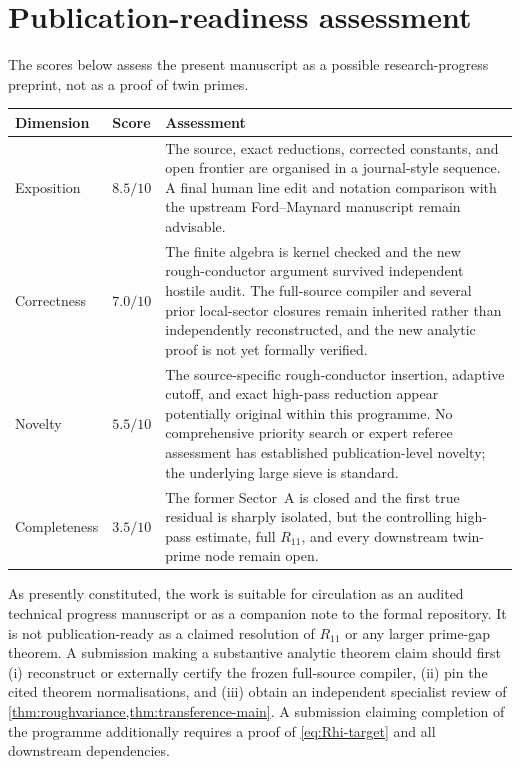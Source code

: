 \section{Publication-readiness assessment}\label{app:readiness}

The scores below assess the present manuscript as a possible research-progress
preprint, not as a proof of twin primes.

\begin{center}
\begin{tabularx}{\textwidth}{@{}p{}p{}X@{}}
\toprule
Dimension & Score & Assessment \\
\midrule
Exposition & $8.5/10$ & The source, exact reductions, corrected constants, and open frontier are organised in a journal-style sequence.  A final human line edit and notation comparison with the upstream Ford--Maynard manuscript remain advisable. \\
\addlinespace
Correctness & $7.0/10$ & The finite algebra is kernel checked and the new rough-conductor argument survived independent hostile audit.  The full-source compiler and several prior local-sector closures remain inherited rather than independently reconstructed, and the new analytic proof is not yet formally verified. \\
\addlinespace
Novelty & $5.5/10$ & The source-specific rough-conductor insertion, adaptive cutoff, and exact high-pass reduction appear potentially original within this programme.  No comprehensive priority search or expert referee assessment has established publication-level novelty; the underlying large sieve is standard. \\
\addlinespace
Completeness & $3.5/10$ & The former Sector~A is closed and the first true residual is sharply isolated, but the controlling high-pass estimate, full $R_{11}$, and every downstream twin-prime node remain open. \\
\bottomrule
\end{tabularx}
\end{center}

As presently constituted, the work is suitable for circulation as an audited
technical progress manuscript or as a companion note to the formal repository.
It is not publication-ready as a claimed resolution of $R_{11}$ or any larger
prime-gap theorem.  A submission making a substantive analytic theorem claim
should first (i) reconstruct or externally certify the frozen full-source
compiler, (ii) pin the cited theorem normalisations, and (iii) obtain an
independent specialist review of \cref{thm:roughvariance,thm:transference-main}.
A submission claiming completion of the programme additionally requires a
proof of \cref{eq:Rhi-target} and all downstream dependencies.

